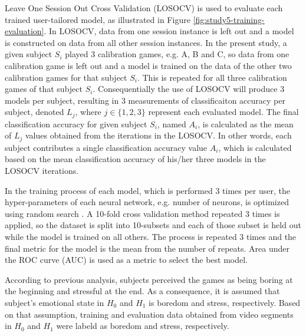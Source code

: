 Leave One Session Out Cross Validation (LOSOCV) is used to evaluate each trained user-tailored model, as illustrated in Figure \ref{fig:study5-training-evaluation}. In LOSOCV, data from one session instance is left out and a model is constructed on data from all other session instances. In the present study, a given subject $S_i$ played 3 calibration games, e.g. A, B and C, so data from one calibration game is left out and a model is trained on the data of the other two calibration games for that subject $S_i$. This is repeated for all three calibration games of that subject $S_i$. Consequentially the use of LOSOCV will produce 3 models per subject, resulting in 3 measurements of classificaiton accuracy per subject, denoted $L_j$, where $j \in \{1, 2, 3\}$ represent each evaluated model. The final classification accuracy for given subject $S_i$, named $A_i$, is calculated as the mean of $L_j$ values obtained from the iterations in the LOSOCV. In other words, each subject contributes a single classification accuracy value $A_i$, which is calculated based on the mean classification accuracy of his/her three models in the LOSOCV iterations.

In the training process of each model, which is performed 3 times per user, the hyper-parameters of each neural network, e.g. number of neurons, is optimized using random search \parencite{bergstra2012random}. A 10-fold cross validation method repeated 3 times is applied, so the dataset is split into 10-subsets and each of those subset is held out while the model is trained on all others. The process is repeated 3 times and the final metric for the model is the mean from the number of repeats. Area under the ROC curve (AUC) is used as a metric to select the best model.

According to previous analysis, subjects perceived the games as being boring at the beginning and stressful at the end. As a consequence, it is assumed that subject's emotional state in $H_0$ and $H_1$ is boredom and stress, respectively. Based on that assumption, training and evaluation data obtained from video segments in $H_0$ and $H_1$ were labeld as boredom and stress, respectively.



